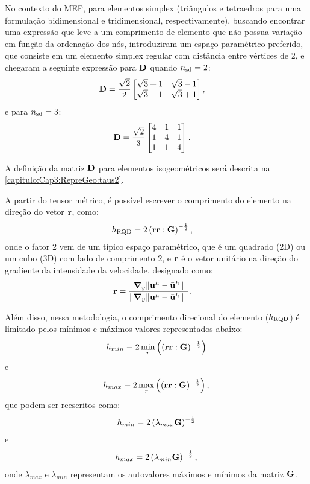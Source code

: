 No contexto do MEF, para elementos simplex (triângulos e tetraedros para uma formulação bidimensional e tridimensional, respectivamente), buscando encontrar uma expressão que leve a um comprimento de elemento que não possua variação em função da ordenação dos nós,  introduziram um espaço paramétrico preferido, que consiste em um elemento simplex regular com distância entre vértices de 2, e chegaram a seguinte expressão para $\mathbf{D}$ quando ${n_{\mathrm{sd}}} = 2$:
\begin{align}
	\mathbf{D}&= \frac{\sqrt{2}}{2} \begin{bmatrix}
		\sqrt{3} + 1 & \sqrt{3} - 1 \\
		\sqrt{3} - 1 & \sqrt{3} + 1
	\end{bmatrix},
\end{align}
\noindent e para ${n_{\mathrm{sd}}} = 3$:
\begin{align}
	\mathbf{D}&= \frac{\sqrt{2}}{3} \begin{bmatrix}
		4 & 1 & 1 \\
		1 & 4 & 1 \\
		1 & 1 & 4
	\end{bmatrix}.
\end{align}

A definição da matriz $\mathbf{D}$ para elementos isogeométricos será descrita na \autoref{capitulo:Cap3:RepreGeo:taus2}.

A partir do tensor métrico, é possível escrever o comprimento do elemento na direção do vetor $\mathbf{r}$, como:
\begin{align}
	h_{\mathrm{RQD}} &=2\left(\mathbf{r}\mathbf{r} : \mathbf{G} \right)^{-\frac{1}{2}},
\end{align}
\noindent onde o fator 2 vem de um típico espaço paramétrico, que é um quadrado (2D) ou um cubo (3D) com lado de comprimento 2, e $\mathbf{r}$ é o vetor unitário na direção do gradiente da intensidade da velocidade, designado como:
\begin{align}
	\mathbf{r}&=\frac{\boldsymbol{\nabla}_y \lVert\mathbf{u}^h - \bar{\mathbf{u}}^h\rVert}{\lVert \boldsymbol{\nabla}_y \lVert\mathbf{u}^h - \bar{\mathbf{u}}^h\rVert\rVert}. \label{eq:rRGN}
\end{align}

Além disso, nessa metodologia, o comprimento direcional do elemento ($h_{\mathrm{RQD}}$) é limitado pelos mínimos e máximos valores representados abaixo:
\begin{align}
	h_{min} \equiv 2\min_{r}\left((\mathbf{r}\mathbf{r}:\mathbf{G})^{-\frac{1}{2}} \right)
\end{align}
\noindent e
\begin{align}
	h_{max} \equiv 2\max_{r}\left((\mathbf{r}\mathbf{r}:\mathbf{G})^{-\frac{1}{2}} \right),
\end{align}
\noindent que podem ser reescritos como:
\begin{align}
	h_{min} = 2\left(\lambda_{max}\mathbf{G}\right)^{-\frac{1}{2}}
\end{align}
\noindent e
\begin{align}
	h_{max} = 2\left(\lambda_{min}\mathbf{G}\right)^{-\frac{1}{2}},
\end{align}
\noindent onde $\lambda_{max}$ e $\lambda_{min}$ representam os autovalores máximos e mínimos da matriz $\mathbf{G}$. 

